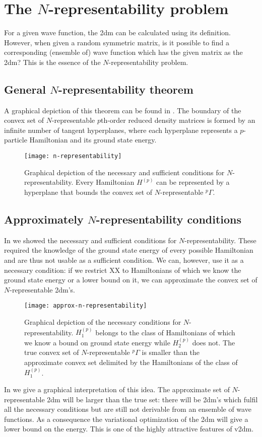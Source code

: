 \chapter{The $N$-representability problem}\label{ch2}

For a given wave function, the \gls{2dm} can be calculated using its definition. However, when given a random symmetric matrix,
is it possible to find a corresponding (ensemble of) wave function which has the given matrix as the \gls{2dm}? This is the essence of the $N$-representability problem.

\section{General \mbox{$N$-representability} theorem}\label{ch2-general-n-rep}
A graphical depiction of this theorem can be found in . The boundary of the convex set
of $N$-representable $p$th-order reduced density matrices is formed by an infinite number of tangent hyperplanes, where
each hyperplane represents a $p$-particle Hamiltonian and its ground state energy.
\begin{figure}
    \centering
    \texttt{[image: n-representability]}
    \caption{Graphical depiction of the necessary and sufficient conditions for $N$-representability. Every Hamiltonian $H^{(p)}$ can be represented by a hyperplane that bounds the convex set of $N$-representable ${^p\Gamma}$.}
    \label{ch2-fig1}
\end{figure}

\section{Approximately $N$-representability conditions}\label{2-approx-n-representability}
In  we showed the necessary and sufficient conditions for $N$-representability. These required the knowledge of the
ground state energy of every possible Hamiltonian and are thus not usable as a sufficient condition. We can, however, use it as a necessary
condition: if we restrict XX to Hamiltonians of which we know the ground state energy or a lower bound on it, we can approximate the convex set of $N$-representable \gls{2dm}'s.
\begin{figure}
    \centering
    \texttt{[image: approx-n-representability]}
    \caption{Graphical depiction of the necessary conditions for $N$-representability. $H_1^{(p)}$ belongs to the class of Hamiltonians of which we know a bound on ground state energy while $H_2^{(p)}$ does not. The true convex set of $N$-representable ${^p\Gamma}$ is smaller than the approximate convex set delimited by the Hamiltonians of the class of $H_1^{(p)}$.}
    \label{ch2-fig3}
\end{figure}
In  we give a graphical interpretation of this idea. The approximate set of $N$-representable \gls{2dm} will be larger than the true set: there will be \gls{2dm}'s which fulfil all the necessary conditions but are still not derivable from an ensemble of wave functions.
As a consequence the variational optimization of the \gls{2dm} will give a lower bound on the energy. This is one of the highly attractive features of \gls{v2dm}.


